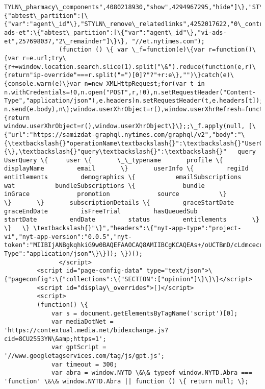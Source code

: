 \documentclass[11pt]{article}
\begin{document}
\begin{Verbatim}[commandchars=\\\{\}]
TYLN\_pharmacy\_components",4080218930,"show",4294967295,"hide"]\},"STYLN\_remove\_relatedlinks":\{"abtest\_partition":[\{"var":"agent\_id"\},"STYLN\_remove\_relatedlinks",4252017622,"0\_control\_STYLN\_remove\_relatedlinks",4294967295,"1\_remove\_relatedlinks"]\},"vi-ads-et":\{"abtest\_partition":[\{"var":"agent\_id"\},"vi-ads-et",257698037,"2\_remainder"]\}\}, "//et.nytimes.com");
               (function () \{ var \_f=function(e)\{var r=function()\{var r=e.url;try\{r+=window.location.search.slice(1).split("\&").reduce(function(e,r)\{return"ip-override"===r.split("=")[0]?"?"+r:e\},"")\}catch(e)\{console.warn(e)\}var n=new XMLHttpRequest;for(var t in n.withCredentials=!0,n.open("POST",r,!0),n.setRequestHeader("Content-Type","application/json"),e.headers)n.setRequestHeader(t,e.headers[t]);return n.send(e.body),n\};window.userXhrObject=r(),window.userXhrRefresh=function()\{return window.userXhrObject=r(),window.userXhrObject\}\};;\_f.apply(null, [\{"url":"https://samizdat-graphql.nytimes.com/graphql/v2","body":"\{\textbackslash{}"operationName\textbackslash{}":\textbackslash{}"UserQuery\textbackslash{}",\textbackslash{}"variables\textbackslash{}":\{\},\textbackslash{}"query\textbackslash{}":\textbackslash{}"   query UserQuery \{     user \{       \_\_typename       profile \{         displayName         email       \}       userInfo \{         regiId         entitlements         demographics \{           emailSubscriptions           wat           bundleSubscriptions \{             bundle             inGrace             promotion             source           \}         \}       \}       subscriptionDetails \{         graceStartDate         graceEndDate         isFreeTrial         hasQueuedSub         startDate         endDate         status         entitlements       \}     \}   \} \textbackslash{}"\}","headers":\{"nyt-app-type":"project-vi","nyt-app-version":"0.0.5","nyt-token":"MIIBIjANBgkqhkiG9w0BAQEFAAOCAQ8AMIIBCgKCAQEAs+/oUCTBmD/cLdmcecrnBMHiU/pxQCn2DDyaPKUOXxi4p0uUSZQzsuq1pJ1m5z1i0YGPd1U1OeGHAChWtqoxC7bFMCXcwnE1oyui9G1uobgpm1GdhtwkR7ta7akVTcsF8zxiXx7DNXIPd2nIJFH83rmkZueKrC4JVaNzjvD+Z03piLn5bHWU6+w+rA+kyJtGgZNTXKyPh6EC6o5N+rknNMG5+CdTq35p8f99WjFawSvYgP9V64kgckbTbtdJ6YhVP58TnuYgr12urtwnIqWP9KSJ1e5vmgf3tunMqWNm6+AnsqNj8mCLdCuc5cEB74CwUeQcP2HQQmbCddBy2y0mEwIDAQAB","Accept":"application/json","Content-Type":"application/json"\}\}]); \})();
               </script>
         <script id="page-config-data" type="text/json">\{"pageconfig":\{"collections":\{"SECTION":["opinion"]\}\}\}</script>
         <script id="display\_overrides">[]</script>
         <script>
         (function() \{
             var s = document.getElementsByTagName('script')[0];
             var mediaDotNet = 'https://contextual.media.net/bidexchange.js?cid=8CU2553YN\&amp;https=1';
             var gptScript = '//www.googletagservices.com/tag/js/gpt.js';
             var timeout = 300;
             var abra = window.NYTD \&\& typeof window.NYTD.Abra === 'function' \&\& window.NYTD.Abra || function () \{ return null; \};
         

\end{Verbatim}
\end{document}
